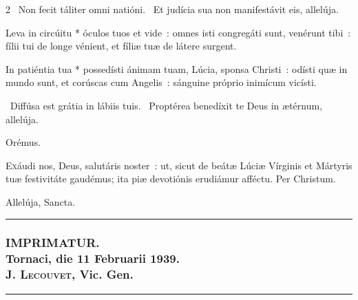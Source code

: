 \documentclass[9pt,twoside]{extarticle}
\begin{document}
\begin{multicols}{2}
\normalsize {}~Non fecit táliter omni natióni. ~Et judícia sua non manifestávit eis, allelúja.

 Leva in circúitu * óculos tuos et vide~: omnes isti congregáti sunt, venérunt tibi~: fílii tui de longe vénient, et fíliæ tuæ de látere surgent.

{\small {}}

 In patiéntia tua * possedísti ánimam tuam, Lúcia, sponsa Christi~: odísti quæ in mundo sunt, et corúscas cum Angelis~: sánguine próprio inimícum vicísti.

~Diffúsa est grátia in lábiis tuis. ~Proptérea benedíxit te Deus in ætérnum, allelúja.

\noindent Orémus. \hfill {}

\lettrine{E}{x}áudi nos, Deus, salutáris noster~: ut, sicut de beátæ Lúciæ Vírginis et Mártyris tuæ festivitáte gaudémus; ita piæ devotiónis erudiámur afféctu. Per Christum.

\smallskip
\small {}


 Allelúja, Sancta.

\normalsize


\begin{center}\textcolor{red}{\rule{\linewidth}{0.5pt}} \end{center}

\subsubsection*{\center \normalfont IMPRIMATUR.\\
Tornaci, die 11 Februarii 1939.\\
\textsc{J. Lecouvet}, Vic. Gen.}

\fancyhead[C]{}
\fancyfoot[C]{}
\begin{center}\textcolor{red}{\rule{\linewidth}{0.5pt}} \end{center}
\end{multicols}
\end{document}
